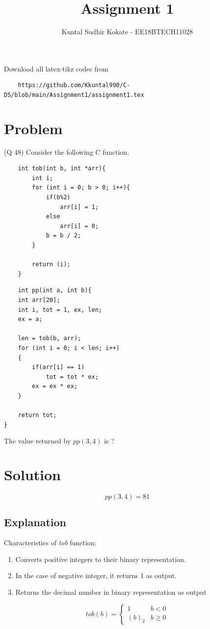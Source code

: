 \documentclass[journal,12pt,twocolumn]{IEEEtran}
\begin{document}
     \def\rightbox#1{\makebox[0in][r]{#1}}
     \def\centbox#1{\makebox[0in]{#1}}
     \def\topbox#1{\raisebox{-\baselineskip}[0in][0in]{#1}}
     \def\midbox#1{\raisebox{-0.5\baselineskip}[0in][0in]{#1}}
\vspace{3cm}
\title{Assignment 1}
\author{Kuntal Sudhir Kokate - EE18BTECH11028}
\maketitle
\newpage
\bigskip
\renewcommand{\thefigure}{\theenumi}
\renewcommand{\thetable}{\theenumi}
Download all latex-tikz codes from 
%
\begin{lstlisting}
    https://github.com/Kkuntal990/C-DS/blob/main/Assignment1/assignment1.tex
\end{lstlisting}
\section{Problem}
(Q 48) Consider the following C function.
\begin{lstlisting}
    int tob(int b, int *arr){
        int i;
        for (int i = 0; b > 0; i++){
            if(b%2)
                arr[i] = 1;
            else
                arr[i] = 0;
            b = b / 2;
        }
    
        return (i);
    }
\end{lstlisting}

\begin{lstlisting}
    int pp(int a, int b){
    int arr[20];
    int i, tot = 1, ex, len;
    ex = a;

    len = tob(b, arr);
    for (int i = 0; i < len; i++)
    {
        if(arr[i] == 1)
            tot = tot * ex;
        ex = ex * ex;
    }

    return tot;
}
\end{lstlisting}

The value returned by $pp(3,4)$ is ?

\section{Solution}
\textbf{$$pp(3,4) = 81$$}

\subsection{Explanation}
Characteristics of \textsl{tob} function:
\begin{enumerate}
    \item Converts positive integers to their binary representation.
    \item In the case of negative integer, it returns 1 as output.
    \item Returns the decimal number in binary representation as output
\end{enumerate}
\vspace{1 cm}
 \[ tob(b) = 
    \begin{cases} 
    1 & b < 0 \\
    (b)_2 & b \geq 0
 \end{cases}
    \]
\end{document}
